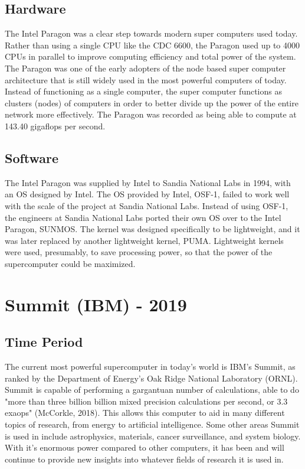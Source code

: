 \documentclass[letterpaper, 10 pt, conference]{IEEEconf}
\begin{document}
\subsection{Hardware}
The Intel Paragon was a clear step towards modern super computers used today. Rather than using a single CPU like the CDC 6600, the Paragon used up to 4000 CPUs in parallel to improve computing efficiency and total power of the system. The Paragon was one of the early adopters of the node based super computer architecture that is still widely used in the most powerful computers of today. Instead of functioning as a single computer, the super computer functions as clusters (nodes) of computers in order to better divide up the power of the entire network more effectively. The Paragon was recorded as being able to compute at 143.40 gigaflops per second. 
\subsection{Software}
The Intel Paragon was supplied by Intel to Sandia National Labs in
1994, with an OS designed by Intel. The OS provided by Intel,
OSF-1, failed to work well with the scale of the project at Sandia
National Labs. Instead of using OSF-1, the engineers at Sandia
National Labs ported their own OS over to the Intel Paragon,
SUNMOS. The kernel was designed specifically to be lightweight,
and it was later replaced by another lightweight kernel, PUMA.
Lightweight kernels were used, presumably, to save processing
power, so that the power of the supercomputer could be maximized.


\section{Summit (IBM) - 2019}
\subsection{Time Period}
The current most powerful supercomputer in today's world is IBM's Summit, as ranked by the Department of Energy's Oak Ridge National Laboratory (ORNL). Summit is capable of performing a gargantuan number of calculations, able to do "more than three billion billion mixed precision calculations per second, or 3.3 exaops" (McCorkle, 2018). This allows this computer to aid in many different topics of research, from energy to artificial intelligence. Some other areas Summit is used in include astrophysics, materials, cancer surveillance, and system biology. With it's enormous power compared to other computers, it has been and will continue to provide new insights into whatever fields of research it is used in.
\end{document}
